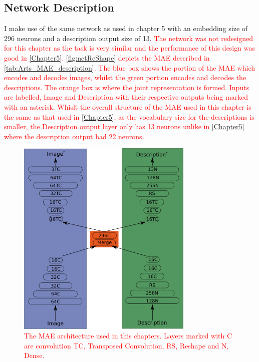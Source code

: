\subsection{Network Description}
I make use of the same network as used in chapter 5 with an embedding size of 296 neurons and a description output size of 13. \textcolor{red}{The network was not redesigned for this chapter as the task is very similar and the performance of this design was good in \autoref{Chapter5}. \autoref{fig:netReShape} depicts the \ac{MAE} described in \autoref{tab:Arts_MAE_description}. The blue box shows the portion of the \ac{MAE} which encodes and decodes images, whilst the green portion encodes and decodes the descriptions. The orange box is where the joint representation is formed. Inputs are labelled, Image and Description with their respective outputs being marked with an asterisk. Whislt the overall structure of the \ac{MAE} used in this chapter is the same as that used in \autoref{Chapter5}, as the vocabulary size for the descriptions is smaller, the Description output layer only has 13 neurons unlike in \autoref{Chapter5} where the description output had 22 neurons.}

\begin{figure}
\centering
\includegraphics[width=0.75\textwidth]{Figs/chapter6/maeArch.png}
\caption{\textcolor{red}{The \ac{MAE} architecture used in this chapters. Layers marked with C are convolution TC, Transposed Convolution, RS, Reshape and N, Dense.}}
\label{fig:netReShape}
\end{figure}



